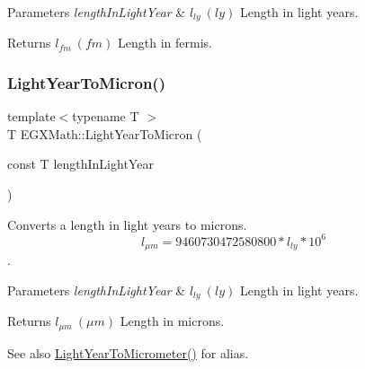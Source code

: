 \begin{DoxyParams}{Parameters}
{\em length\+In\+Light\+Year} & $ l_{ly}\ (ly)$ Length in light years. \\
\hline
\end{DoxyParams}
\begin{DoxyReturn}{Returns}
$ l_{fm}\ (fm)$ Length in fermis. 
\end{DoxyReturn}
\mbox{\label{group___e_g_x_math-_conversions-_length_conversions-_astronomical-_light_year-_non-_s_i_gaa1be4e14f5ac7b272f28ce3e115b61c7}} 
\subsubsection{\texorpdfstring{Light\+Year\+To\+Micron()}{LightYearToMicron()}}
{\footnotesize\ttfamily template$<$typename T $>$ \\
T E\+G\+X\+Math\+::\+Light\+Year\+To\+Micron (\begin{DoxyParamCaption}\item[{const T}]{length\+In\+Light\+Year }\end{DoxyParamCaption})}



Converts a length in light years to microns. \[ l_{\mu m}=9460730472580800 * l_{ly} * 10^{6} \]. 


\begin{DoxyParams}{Parameters}
{\em length\+In\+Light\+Year} & $ l_{ly}\ (ly)$ Length in light years. \\
\hline
\end{DoxyParams}
\begin{DoxyReturn}{Returns}
$ l_{\mu m}\ (\mu m)$ Length in microns. 
\end{DoxyReturn}
\begin{DoxySeeAlso}{See also}
\mbox{\hyperlink{group___e_g_x_math-_conversions-_length_conversions-_astronomical-_light_year-_s_i_gaa3dbed351199e0c91fb3e72aea833233}{Light\+Year\+To\+Micrometer()}} for alias. 
\end{DoxySeeAlso}
\mbox{\label{group___e_g_x_math-_conversions-_length_conversions-_astronomical-_light_year-_non-_s_i_gac275191181b93d118ec2b21cf09ff356}} 
